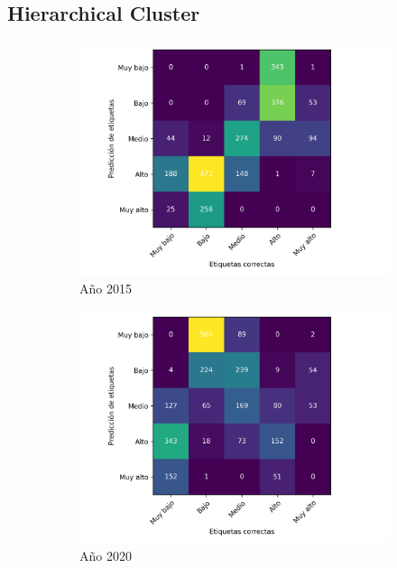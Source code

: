 \subsection{Hierarchical Cluster}

\begin{figure}[H]
    \centering
    \begin{subfigure}{8.4cm}
        \includegraphics[width=1\linewidth]{Graphics/Data_2015/Cluster_confusion_matrix.png}
        \caption{Año 2015}
    \end{subfigure}
    \begin{subfigure}{8.4cm}
        \includegraphics[width=1\linewidth]{Graphics/Data_2020/Cluster_confusion_matrix.png}
        \caption{Año 2020}
    \end{subfigure}
    \caption{}
\end{figure}
